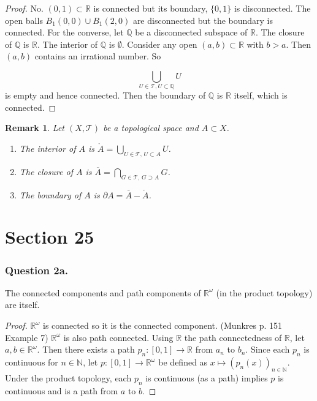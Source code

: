 \documentclass[12pt]{article}
\newtheorem{remark}{Remark}
\begin{document}
\begin{proof}
    No. $(0, 1) \subset \mathbb{R}$ is connected but its boundary,
    $\{0, 1\}$ is disconnected. The open balls $B_1(0, 0) \cup B_1(2, 0)$
    are disconnected but the boundary is connected. For the converse,
    let $\mathbb{Q}$ be a disconnected subspace of $\mathbb{R}$.
    The closure of $\mathbb{Q}$ is $\mathbb{R}$. The interior of $\mathbb{Q}$
    is $\emptyset$. Consider any open $(a, b) \subset \mathbb{R}$
    with $b > a$. Then $(a, b)$ contains an irrational number. So 
    
    $$\bigcup_{U \in \mathcal{T}, U \subset \mathbb{Q}} U$$ is empty and hence connected.
    Then the boundary of $\mathbb{Q}$ is $\mathbb{R}$ itself, which is connected.
\end{proof}
\begin{remark}
    Let $(X, \mathcal{T})$ be a topological space and $A \subset X$.
\begin{enumerate}
    \item The \textit{interior} of $A$ is $\mathring{A} = \bigcup_{U \in \mathcal{T}, \, U \subset A} U$.
    \item The \textit{closure} of $A$ is $\overline{A} = \bigcap_{G \in \mathcal{T}, \, G \supset A} G$.
    \item The \textit{boundary} of $A$ is $\partial A = \overline{A} - \mathring{A}$.
\end{enumerate}
\end{remark}

\section{Section 25}
\subsubsection*{Question 2a.}
The connected components and path components 
of 
$\mathbb{R}^\omega$ (in the product topology)
are itself.
\begin{proof}
    $\mathbb{R}^\omega$ is connected so it is the connected component.
    (Munkres p. 151 Example 7)
    $\mathbb{R}^\omega$ is also path connected. Using 
    $\mathbb{R}$ the path connectedness of $\mathbb{R}$,
    let $a, b \in \mathbb{R}^\omega$. Then there exists a path 
    $p_n: [0, 1] \rightarrow \mathbb{R}$ from $a_n$ to $b_n$.
    Since each $p_n$ is continuous for $n \in \mathbb{N}$,
    let $p: [0, 1] \rightarrow \mathbb{R}^\omega$ be defined as 
    $x \mapsto (p_n(x))_{n \in \mathbb{N}}$. Under the product topology,
    each $p_n$ is continuous (as a path) implies
    $p$ is continuous and is a path from $a$ to $b$.

\end{proof}
\end{document}

